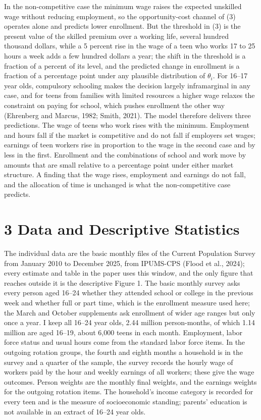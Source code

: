 \documentclass[12pt]{article}
\begin{document}
In the non-competitive case the minimum wage raises the expected unskilled wage without reducing employment, so the opportunity-cost channel of (3) operates alone and predicts lower enrollment. But the threshold in (3) is the present value of the skilled premium over a working life, several hundred thousand dollars, while a 5 percent rise in the wage of a teen who works 17 to 25 hours a week adds a few hundred dollars a year; the shift in the threshold is a fraction of a percent of its level, and the predicted change in enrollment is a fraction of a percentage point under any plausible distribution of $\theta_i$. For 16--17 year olds, compulsory schooling makes the decision largely inframarginal in any case, and for teens from families with limited resources a higher wage relaxes the constraint on paying for school, which pushes enrollment the other way (Ehrenberg and Marcus, 1982; Smith, 2021). The model therefore delivers three predictions. The wage of teens who work rises with the minimum. Employment and hours fall if the market is competitive and do not fall if employers set wages; earnings of teen workers rise in proportion to the wage in the second case and by less in the first. Enrollment and the combinations of school and work move by amounts that are small relative to a percentage point under either market structure. A finding that the wage rises, employment and earnings do not fall, and the allocation of time is unchanged is what the non-competitive case predicts.

\section{3 Data and Descriptive Statistics}

The individual data are the basic monthly files of the Current Population Survey from January 2010 to December 2025, from IPUMS-CPS (Flood et al., 2024); every estimate and table in the paper uses this window, and the only figure that reaches outside it is the descriptive Figure 1. The basic monthly survey asks every person aged 16--24 whether they attended school or college in the previous week and whether full or part time, which is the enrollment measure used here; the March and October supplements ask enrollment of wider age ranges but only once a year. I keep all 16--24 year olds, 2.44 million person-months, of which 1.14 million are aged 16--19, about 6,000 teens in each month. Employment, labor force status and usual hours come from the standard labor force items. In the outgoing rotation groups, the fourth and eighth months a household is in the survey and a quarter of the sample, the survey records the hourly wage of workers paid by the hour and weekly earnings of all workers; these give the wage outcomes. Person weights are the monthly final weights, and the earnings weights for the outgoing rotation items. The household's income category is recorded for every teen and is the measure of socioeconomic standing; parents' education is not available in an extract of 16--24 year olds.
\end{document}
